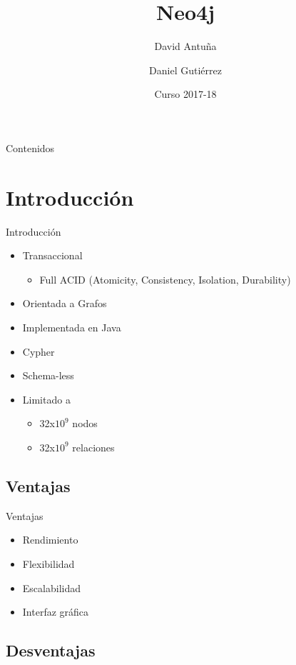 \documentclass{beamer}
\title{Neo4j}
\author{David Antuña \and Daniel Gutiérrez}
\institute[UCM]
{
  Bases de Datos NoSQL\\
  Universidad Complutense de Madrid
}
\date{Curso 2017-18}
\begin{document}
\begin{frame}
	\titlepage
\end{frame}

\begin{frame}{Contenidos}
	\tableofcontents
\end{frame}

\section{Introducción}

\begin{frame}{Introducción}
	\begin{itemize}
		\item Transaccional
		      \begin{itemize}
			      \item Full ACID (Atomicity, Consistency, Isolation, Durability)
		      \end{itemize}
		\item Orientada a Grafos
		\item Implementada en Java
		\item Cypher
		\item Schema-less
		\item Limitado a
		      \begin{itemize}
			      \item 32x$10^9$ nodos
			      \item 32x$10^9$ relaciones
		      \end{itemize}
	\end{itemize}
\end{frame}

\subsection{Ventajas}

\begin{frame}{Ventajas}
	\begin{itemize}
		\item Rendimiento
		      \pause
		\item Flexibilidad
		\item Escalabilidad
		      \pause
    \item Interfaz gráfica
	\end{itemize}
\end{frame}

\subsection{Desventajas}
\end{document}
